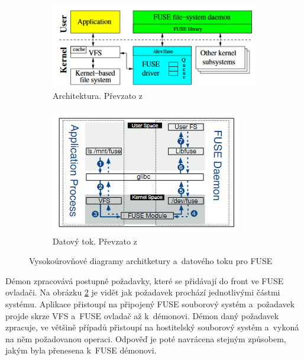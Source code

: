 \begin{figure}[h]
    \begin{subfigure}[h]{.45\linewidth}
        \centering
        \includegraphics[width=1 \linewidth]{other-fig/FUSE_architecture.png}
        \caption{Architektura. Převzato z \cite{FuseOrNotToFuse}}
    \end{subfigure}
    \hfill
    \begin{subfigure}[h]{.45\linewidth}
        \centering
        \includegraphics[width=1 \linewidth]{other-fig/FUSE_dataflow.png}
        \caption{Datový tok. Převzato z \cite{HardeningFUSE}}
        \label{fig:fuse_dataflow}
    \end{subfigure}
    \caption{Vysokoúrovňové diagramy architketury a datového toku pro FUSE}
\end{figure}

Démon zpracovává postupně požadavky, které se přidávají do front ve FUSE ovladači. Na obrázku \ref{fig:fuse_dataflow} je vidět jak požadavek prochází jednotlivými částmi
systému. Aplikace přistoupí na připojený FUSE souborový systém a požadavek projde skrze VFS a FUSE ovladač až k démonovi. Démon daný požadavek zpracuje, ve většině případů
přistoupí na hostitelský souborový systém a vykoná na něm požadovanou operaci. Odpověď je poté navrácena stejným způsobem, jakým byla přenesena k FUSE démonovi.

